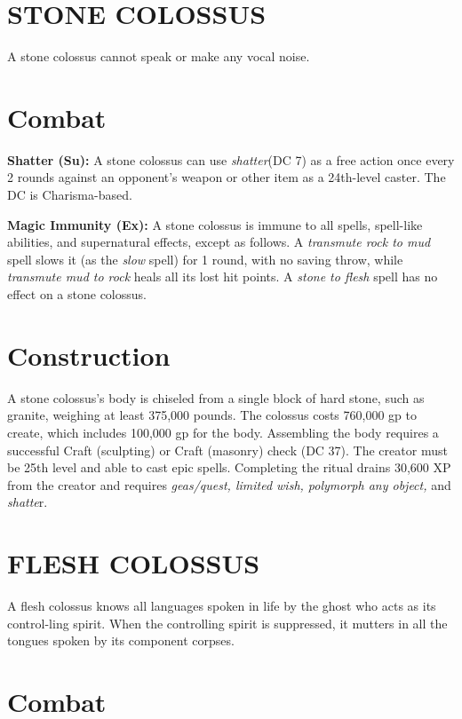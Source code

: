 \documentclass{article}
\begin{document}
\section*{STONE COLOSSUS }

A stone colossus cannot speak or make any vocal noise. 

\section*{Combat\textbf{ }}

\textbf{Shatter (Su):} A stone colossus can use \textit{shatter}(DC 7)\textit{ 
}as a free action once every 2 rounds against an opponent's weapon or other item 
as a 24th-level caster. The DC is Charisma-based.

\textbf{Magic Immunity (Ex):} A stone colossus is immune to all spells, spell-like 
abilities, and supernatural effects, except as follows. A \textit{transmute rock 
to mud }spell slows it (as the \textit{slow }spell) for 1 round, with no saving 
throw, while \textit{transmute mud to rock }heals all its lost hit points. A \textit{stone 
to flesh }spell has no effect on a stone colossus. 

\section*{\textbf{Construction }}

A stone colossus's body is chiseled from a single block of hard stone, such as 
granite, weighing at least 375,000 pounds. The colossus costs 760,000 gp to create, 
which includes 100,000 gp for the body. Assembling the body requires a successful 
Craft (sculpting) or Craft (masonry) check (DC 37). The creator must be 25th level 
and able to cast epic spells. Completing the ritual drains 30,600 XP from the creator 
and requires \textit{geas/quest, limited wish, polymorph any object, }and \textit{shatte}r. 

\section*{FLESH COLOSSUS }

A flesh colossus knows all languages spoken in life by the ghost who acts as its 
control-ling spirit. When the controlling spirit is suppressed, it mutters in all 
the tongues spoken by its component corpses. 

\section*{Combat\textbf{ }}
\end{document}
